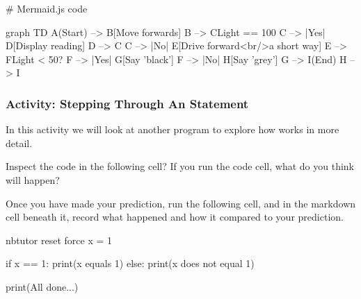 \documentclass[letterpaper,10pt,english]{sphinxmanual}
\begin{document}
# Mermaid.js code

graph TD
    A(Start) --> B[Move forwards]
    B --> C{Light == 100}
    C --> |Yes| D[Display reading]
    D --> C
    C --> |No| E[Drive forward<br/>a short way]
    E --> F{Light < 50?}
    F --> |Yes| G[Say 'black']
    F --> |No| H[Say 'grey']
    G --> I(End)
    H --> I


\subsubsection{Activity: Stepping Through An  Statement}
\label{\detokenize{content/02_Robot_Lab/Section_00_02:Activity:-Stepping-Through-An-if..else...-Statement}}
In this activity we will look at another program to explore how  works in more detail.

Inspect the code in the following cell? If you run the code cell, what do you think will happen?


Once you have made your prediction, run the following cell, and in the markdown cell beneath it, record what happened and how it compared to your prediction.


{
\begin{sphinxVerbatim}[commandchars=\\\{\}]
\llap{\color{nbsphinxin}[ ]:\,\hspace{\fboxrule}\hspace{\fboxsep}}\PYGZsh{}\PYGZpc{}\PYGZpc{}nbtutor \PYGZhy{}\PYGZhy{}reset \PYGZhy{}\PYGZhy{}force
x = 1

if x == 1:
    print(\PYGZdq{}x equals 1\PYGZdq{})
else:
    print(\PYGZdq{}x does not equal 1\PYGZdq{})

print(\PYGZdq{}All done...\PYGZdq{})
\end{sphinxVerbatim}
}
\end{document}
